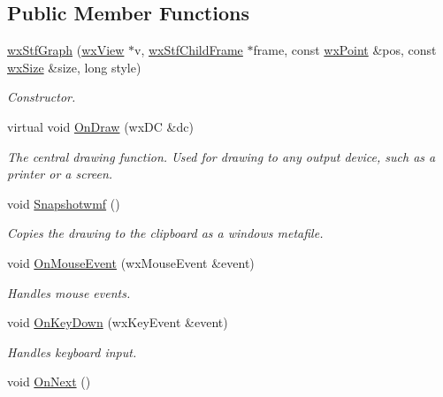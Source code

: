 \subsection*{Public Member Functions}
\begin{DoxyCompactItemize}
\item 
\hyperlink{classwxStfGraph_aa19a02121e8240a197ec10a20e3751ca}{wxStfGraph} (\hyperlink{classwxView}{wxView} $\ast$v, \hyperlink{classwxStfChildFrame}{wxStfChildFrame} $\ast$frame, const \hyperlink{classwxPoint}{wxPoint} \&pos, const \hyperlink{classwxSize}{wxSize} \&size, long style)
\begin{DoxyCompactList}\small\item\em Constructor. \item\end{DoxyCompactList}\item 
virtual void \hyperlink{classwxStfGraph_ab22a974e78c974e314949a1f6c04f2bf}{OnDraw} (wxDC \&dc)
\begin{DoxyCompactList}\small\item\em The central drawing function. Used for drawing to any output device, such as a printer or a screen. \item\end{DoxyCompactList}\item 
void \hyperlink{classwxStfGraph_af0c2c4b22e9dd59bfd3b6ba1b0f6f69e}{Snapshotwmf} ()
\begin{DoxyCompactList}\small\item\em Copies the drawing to the clipboard as a windows metafile. \item\end{DoxyCompactList}\item 
void \hyperlink{classwxStfGraph_a445bbe3edaf48c30bbda551a34e2a310}{OnMouseEvent} (wxMouseEvent \&event)
\begin{DoxyCompactList}\small\item\em Handles mouse events. \item\end{DoxyCompactList}\item 
void \hyperlink{classwxStfGraph_adcc0249304ccc1807a99625ce287824b}{OnKeyDown} (wxKeyEvent \&event)
\begin{DoxyCompactList}\small\item\em Handles keyboard input. \item\end{DoxyCompactList}\item 
void \hyperlink{classwxStfGraph_aeef23d32da434baf2e6d711017e4003c}{OnNext} ()

\end{DoxyCompactItemize}
